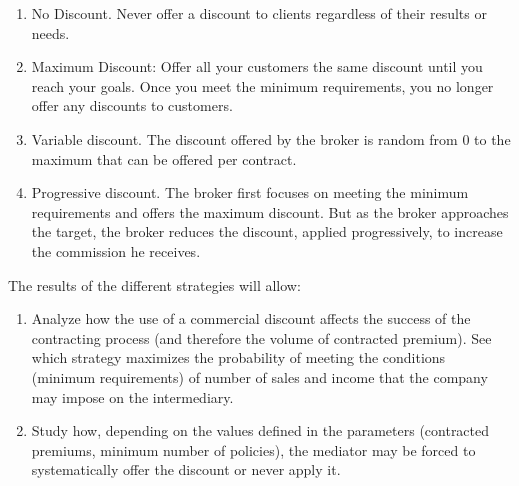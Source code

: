 \documentclass[review]{elsarticle}
\begin{document}
\begin{enumerate}
    \item No Discount. Never offer a discount to clients regardless of their results or needs.%
    \item Maximum Discount: Offer all your customers the same discount until you reach your goals. Once you meet the minimum requirements, you no longer offer any discounts to customers.%
    \item Variable discount. The discount offered by the broker is random from 0 to the maximum that can be offered per contract.%
    \item Progressive discount. The broker first focuses on meeting the minimum requirements and offers the maximum discount. But as the broker approaches the target, the broker reduces the discount, applied progressively, to increase the commission he receives. %
\end{enumerate}

The results of the different strategies will allow:
\begin{enumerate}
    \item Analyze how the use of a commercial discount affects the success of the contracting process (and therefore the volume of contracted premium). See which strategy maximizes the probability of meeting the conditions (minimum requirements) of number of sales and income that the company may impose on the intermediary.
    \item Study how, depending on the values defined in the parameters (contracted premiums, minimum number of policies), the mediator may be forced to systematically offer the discount or never apply it.
\end{enumerate}
\end{document}
